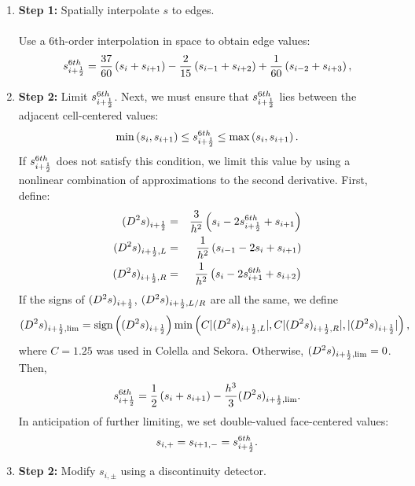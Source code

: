 \begin{enumerate}
\item {\bf Step 1:} Spatially interpolate $s$ to edges.\\ \\
Use a 6th-order interpolation in space to obtain edge values:
\begin{equation}
s_{i+\frac{1}{2}}^{6th} = \frac{37}{60}\left(s_{i}+s_{i+1}\right) - \frac{2}{15}\left(s_{i-1}+s_{i+2}\right) + \frac{1}{60}\left(s_{i-2}+s_{i+3}\right),
\end{equation}
\item {\bf Step 2:} Limit $s_{i+\frac{1}{2}}^{6th}$.
Next, we must ensure that $s_{i+\frac{1}{2}}^{6th}$ lies between the adjacent 
cell-centered values:
\begin{equation}
\min\left(s_{i},s_{i+1}\right) \le s_{i+\frac{1}{2}}^{6th} \le \max\left(s_{i},s_{i+1}\right).
\end{equation}
If $s_{i+\frac{1}{2}}^{6th}$ does not satisfy this condition, we limit this value
by using a nonlinear combination of approximations to the second derivative.
First, define:
\begin{eqnarray}
(D^2s)_{i+\frac{1}{2}} &=& \frac{3}{h^2}\left(s_{i}-2s_{i+\frac{1}{2}}^{6th}+s_{i+1}\right) \\
(D^2s)_{i+\frac{1}{2},L} &=& \frac{1}{h^2}\left(s_{i-1}-2s_{i}+s_{i+1}\right) \\
(D^2s)_{i+\frac{1}{2},R} &=& \frac{1}{h^2}\left(s_{i}-2s_{i+1}^{6th}+s_{i+2}\right)
\end{eqnarray}
If the signs of $(D^2s)_{i+\frac{1}{2}}$, $(D^2s)_{i+\frac{1}{2},L/R}$ are all the
same, we define
\begin{equation}
(D^2s)_{i+\frac{1}{2},\text{lim}} = \text{sign}\left((D^2s)_{i+\frac{1}{2}}\right)\min\left(C|(D^2s)_{i+\frac{1}{2},L}|,C|(D^2s)_{i+\frac{1}{2},R}|,|(D^2s)_{i+\frac{1}{2}}|\right),
\end{equation}
where $C=1.25$ was used in Colella and Sekora.  Otherwise, 
$(D^2s)_{i+\frac{1}{2},\text{lim}}=0$.  Then,
\begin{equation}
s_{i+\frac{1}{2}}^{6th} = \frac{1}{2}\left(s_{i}+s_{i+1}\right) - \frac{h^3}{3}(D^2s)_{i+\frac{1}{2},\text{lim}}.
\end{equation}
In anticipation of further limiting, we set double-valued face-centered values:
\begin{equation}
s_{i,+} = s_{i+1,-} = s_{i+\frac{1}{2}}^{6th}.
\end{equation}
\item {\bf Step 2:} Modify $s_{i,\pm}$ using a discontinuity detector.\\ \\

\end{enumerate}
